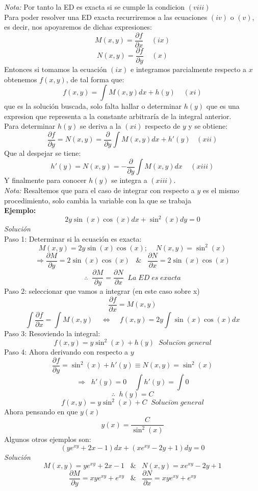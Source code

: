 \documentclass[10pt]{article}
\begin{document}
\textit{Nota:} Por tanto la ED es exacta si se cumple la condicion $(viii)$\\
Para poder resolver una ED exacta recurriremos a las ecuaciones $(iv)$ o $(v)$, es decir, nos apoyaremos de dichas expresiones:
\[M(x,y)=\frac{\partial{f}}{\partial{x}}\;\;\;\;(ix)\]
\[N(x,y)=\frac{\partial{f}}{\partial{y}}\;\;\;\;(x)\]
Entonces si tomamos la ecuación $(ix)$ e integramos parcialmente respecto a $x$ obtenemos $f(x,y)$, de tal forma que:
\[f(x,y)=\int M(x,y)dx+h(y)\;\;\;\;(xi)\]
que es la solución buscada, solo falta hallar o determinar $h(y)$ que es una expresion que representa a la constante arbitraría de la integral anterior.
\\
Para determinar $h(y)$ se deriva a la $(xi)$ respecto de $y$ y se obtiene:
\[\frac{\partial{f}}{\partial{y}}=N(x,y)=\frac{\partial}{\partial{y}}\int M(x,y)dx + h'(y)\;\;\;(xii)\]
Que al despejar se tiene:
\[h'(y)=N(x,y)=-\frac{\partial}{\partial{y}}\int M(x,y)dx\;\;\;\;(xiii)\]
Y finalmente para conocer $h(y)$ se integra a $(xiii)$.
\\
\textit{Nota: }Resaltemos que para el caso de integrar con respecto a $y$ es el mismo procedimiento, solo cambia la variable con la que se trabaja\\
\clearpage
\textbf{Ejemplo:}
\\
\[2y\sin(x)\cos(x)dx+\sin^{2}(x)dy=0\]
\textit{Solución}\\
Paso 1: Determinar si la ecuación es exacta:
\[M(x,y)=2y\sin(x)\cos(x);\;\;\;\;N(x,y)=\sin^{2}(x)\]
\[\Rightarrow \frac{\partial{M}}{\partial{y}}=2\sin(x)\cos(x)\;\;\;\&\;\;\;\frac{\partial{N}}{\partial{x}}=2\sin(x)\cos(x)\]
\[\therefore\;\;\frac{\partial{M}}{\partial{y}}=\frac{\partial{N}}{\partial{x}}\;\;La\;ED\;es\;exacta\]
Paso 2: seleccionar que vamos a integrar (en este caso sobre x)
\[\frac{\partial{f}}{\partial{x}}=M(x,y)\]
\[\int\frac{\partial{f}}{\partial{x}}=\int M(x,y)\;\;\;\;\Leftrightarrow\;\;\;\;f(x,y)=2y\int\sin(x)\cos(x)dx\]
Paso 3: Resoviendo la integral:
\[f(x,y)=y\sin^{2}(x)+h(y)\;\;Soluci\acute{o}n\;general\]
Paso 4: Ahora derivando con respecto a $y$
\[\frac{\partial{f}}{\partial{y}}=\sin^{2}(x)+h'(y)\equiv N(x,y)=\sin^{2}(x)\]
\[\Rightarrow\;\;h'(y)=0\;\;\;\;\int h'(y)=\int 0\]
\[\therefore\;\;h(y)=C\]
\[f(x,y)=y\sin^{2}(x)+C\;\;Soluci\acute{o}n\;general\]
Ahora pensando en que $y(x)$
\[y(x)=\frac{C}{\sin^{2}(x)}\]
\clearpage
Algunos otros ejemplos son:
\[(ye^{xy}+2x-1)dx+(xe^{xy}-2y+1)dy=0\]
\textit{Solución}
\[M(x,y)=ye^{xy}+2x-1\;\;\;\&\;\;\;N(x,y)=xe^{xy}-2y+1\]
\[\frac{\partial{M}}{\partial{y}}=xye^{xy}+e^{xy}\;\;\;\&\;\;\;\frac{\partial{N}}{\partial{x}}=xye^{xy}+e^{xy}\]
\end{document}
